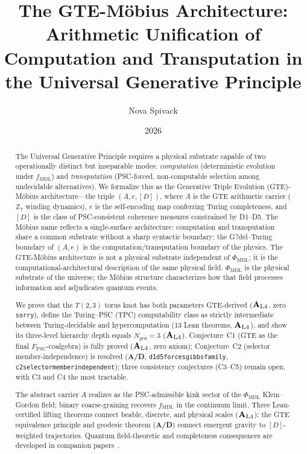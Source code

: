 \documentclass[12pt,letterpaper]{article}
\newcommand{\fmdl}{f_{\mathrm{MDL}}}
\newcommand{\Zseven}{\mathbb{Z}_7}
\newcommand{\Dclass}{[D]}
\newcommand{\ngen}{N_{\mathrm{gen}}}
\newcommand{\catAL}{\ensuremath{\textbf{A}_{\rm L4}}}
\newcommand{\catAD}{\textbf{A/D}}
\newcommand{\lean}[1]{%
  \penalty-100
  \begingroup\def\_{\textunderscore\allowbreak}\texttt{#1}\endgroup}
\begin{document}
\title{The GTE-M\"{o}bius Architecture: Arithmetic Unification of Computation and
Transputation in the Universal Generative Principle}
\author{Nova Spivack}
\date{2026}
\maketitle
\NovaZenodoAfterTitle

\begin{abstract}
The Universal Generative Principle requires a physical substrate capable of two
operationally distinct but inseparable modes: \emph{computation} (deterministic
evolution under $\fmdl$) and \emph{transputation} (PSC-forced, non-computable
selection among undecidable alternatives).  We formalize this as the
Generative Triple Evolution (GTE)-M\"{o}bius architecture---the triple $(A, e, \Dclass)$, where $A$ is the GTE
arithmetic carrier ($\Zseven$ winding dynamics), $e$ is the self-encoding map
conferring Turing completeness, and $\Dclass$ is the class of PSC-consistent
coherence measures constrained by D1--D5.  The M\"{o}bius name reflects a
single-surface architecture: computation and transputation share a common
substrate without a sharp syntactic boundary; the G?del--Turing boundary of
$(A,e)$ is the computation/transputation boundary of the physics.
The GTE-M\"{o}bius architecture is not a physical substrate independent of
$\Phi_{\mathrm{MDL}}$; it is the computational-architectural description of the
same physical field.  $\Phi_{\mathrm{MDL}}$ is the physical substrate of the
universe; the M\"{o}bius structure characterizes how that field processes information
and adjudicates quantum events.

We prove that the $T(2,3)$ torus knot has both parameters GTE-derived
(\catAL{}, zero \texttt{sorry}), define the Turing--PSC (TPC) computability class
as strictly intermediate between Turing-decidable and hypercomputation (13 Lean
theorems, \catAL{}), and show its three-level hierarchy depth equals
$\ngen = 3$ (\catAL{}).  Conjecture~C1 (GTE as the final
$F_{\mathrm{PSC}}$-coalgebra) is fully proved (\catAL{}, zero axiom);
Conjecture~C2 (selector member-independence) is resolved (\catAD{},
\lean{d1\_d5\_forces\_gibbs\_family}, \lean{c2\_selector\_member\_independent});
three consistency conjectures (C3--C5) remain open, with C3 and C4 the most
tractable.

The abstract carrier $A$ realizes as the PSC-admissible kink sector of the
$\Phi_{\mathrm{MDL}}$ Klein--Gordon field; binary coarse-graining recovers
$\fmdl$ in the continuum limit.  Three Lean-certified lifting theorems connect
beable, discrete, and physical scales (\catAL{}); the GTE equivalence principle
and geodesic theorem (\catAD{}) connect emergent gravity to $\Dclass$-weighted
trajectories.  Quantum field-theoretic and completeness consequences are
developed in companion papers~\cite{SpivackCMCA,SpivackThreeTapeCMCA,SpivackPhiMDLField,SpivackCompleteness,SpivackQGR}.
\end{abstract}
\end{document}
